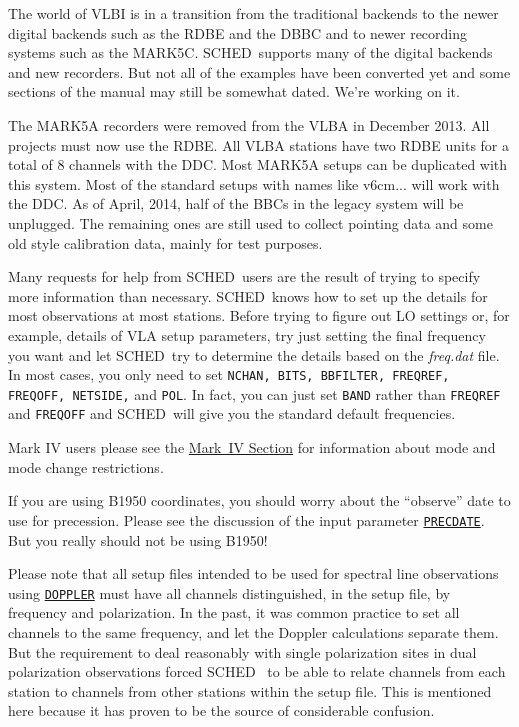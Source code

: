 \documentclass{report}
\newcommand{\schedb}{{\sc SCHED~}}
\begin{document}
\begin{list}{}{\parsep 0.5em \itemsep 0.5em }

\item The world of VLBI is in a transition from the traditional
backends to the newer digital backends such as the RDBE and the DBBC
and to newer recording systems such as the MARK5C.  \schedb supports
many of the digital backends and new recorders.  But not all of the
examples have been converted yet and some sections of the manual may
still be somewhat dated.  We're working on it.

\item The MARK5A recorders were removed from the VLBA in December
2013.  All projects must now use the RDBE.  All VLBA stations have
two RDBE units for a total of 8 channels with the DDC.  Most MARK5A
setups can be duplicated with this system.  Most of the standard 
setups with names like v6cm... will work with the DDC.  As of April,
2014, half of the BBCs in the legacy system will be unplugged.  The
remaining ones are still used to collect pointing data and some old
style calibration data, mainly for test purposes.

\item Many requests for help from \schedb users are the result of trying
to specify more information than necessary.  \schedb knows how to set up
the details for most observations at most stations.  Before trying to
figure out LO settings or, for example, details of VLA setup parameters,
try just setting the final frequency you want and let \schedb try to
determine the details based on the {\sl freq.dat} file.  In most cases,
you only need to set {\tt NCHAN, BITS, BBFILTER, FREQREF, FREQOFF,
NETSIDE,} and {\tt POL}.  In fact, you can just set {\tt BAND} rather
than {\tt FREQREF} and {\tt FREQOFF} and \schedb will give you the
standard default frequencies.

\item Mark IV users please see the 
{\hyperref[SSEC:MKIV]{Mark~IV Section}}
for information about mode and mode change restrictions.

\item If you are using B1950 coordinates, you should worry
about the ``observe'' date to use for precession.  Please see the
discussion of the input parameter 
{\hyperref[MP:PRECDATE]{{\tt PRECDATE}}}.
But you really should not be using B1950!

\item Please note that all setup files intended to be used for
spectral line observations using 
{\hyperref[MP:DOPPLER]{{\tt DOPPLER}}}
must have all channels distinguished, in the setup file, by frequency
and polarization.  In the past, it was common practice to set all
channels to the same frequency, and let the Doppler calculations
separate them.  But the requirement to deal reasonably with single
polarization sites in dual polarization observations forced \schedb
to be able to relate channels from each station to channels from
other stations within the setup file.  This is mentioned here because
it has proven to be the source of considerable confusion.


\end{list}
\end{document}

